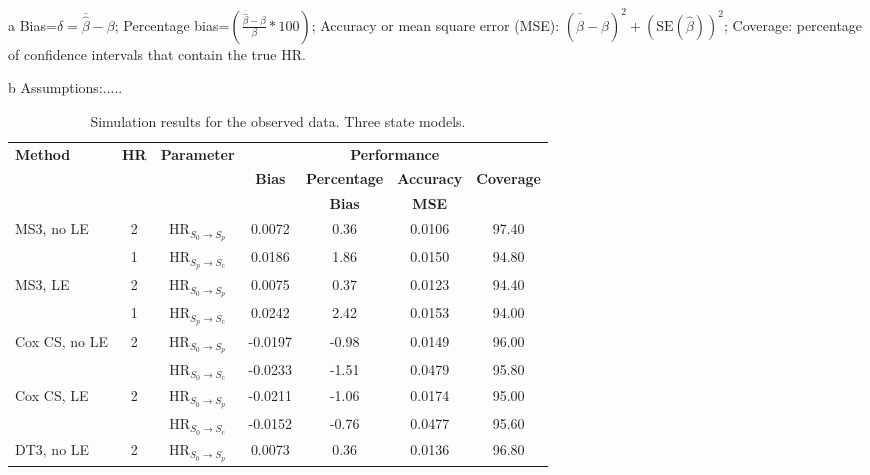 \documentclass{bmcart}
\begin{document}
\begin{backmatter}
\begin{table}[!ht]
\begin{threeparttable}
\begin{tablenotes}
      \item[a] Bias=$\delta=\overline{\hat\beta}-\beta$; Percentage bias=$\left(\frac{\overline{\hat\beta}-\beta}{\beta}*100 \right)$; Accuracy or mean square error (MSE): $(\overline{\hat\beta}-\beta)^2+(\mbox{SE}(\hat \beta))^2$;  Coverage: percentage of confidence intervals that contain the true HR.
      \item[b] Assumptions:.....
    \end{tablenotes}
  \end{threeparttable}
  \label{tab:HRFP_complete}
\end{table}

\begin{table}[!ht]
  \caption{Simulation results for the observed data. Three state models.}
  \begin{threeparttable}
    \begin{tabular}{l|c|c|c|c|c|c}
      \toprule
      \textbf{Method} &   \textbf{HR} & \textbf{Parameter} &\multicolumn{4}{c}{\textbf{Performance}\tnote{a,b}} \\ \cline{4-7}
      & & & \textbf{Bias} & \textbf{Percentage} & \textbf{Accuracy}  &  \textbf{Coverage}  \\
      & & & & \textbf{Bias} &   \textbf{MSE}\\
      \midrule
      \multirow{2}{*}{\parbox{0.2\textwidth}{MS3, no LE}} & 2 & HR$_{S_0 \rightarrow S_p}$ &0.0072&0.36&0.0106&	97.40\\
      &1 & HR$_{S_p \rightarrow S_c}$& 0.0186	&1.86&0.0150&	94.80\\
      \cmidrule{1-7}
      \multirow{2}{*}{\parbox{0.2\textwidth}{MS3, LE}} & 2 & HR$_{S_0 \rightarrow S_p}$ &0.0075 &0.37&0.0123&	94.40\\
      & 1 & HR$_{S_p \rightarrow S_c}$ &0.0242&2.42	&0.0153	&94.00\\
      \midrule
      \multirow{2}{*}{\parbox{0.2\textwidth}{Cox CS, no LE}} & \multirow{2}{*}{2} & HR$_{S_0 \rightarrow S_p}$ &-0.0197 &	-0.98&0.0149& 96.00\\
      && HR$_{S_0 \rightarrow S_c}$ & -0.0233&	-1.51 &0.0479	& 95.80\\
      \cmidrule{1-7}
      \multirow{2}{*}{\parbox{0.2\textwidth}{Cox CS, LE}} & \multirow{2}{*}{2} & HR$_{S_0 \rightarrow S_p}$ &-0.0211 &-1.06 &	0.0174 &	95.00\\
      && HR$_{S_0 \rightarrow S_c}$ &-0.0152	&-0.76	&0.0477&95.60\\
      \midrule
      \multirow{2}{*}{\parbox{0.2\textwidth}{DT3, no LE}} & \multirow{2}{*}{2} & HR$_{S_0 \rightarrow S_p}$ & 0.0073	&0.36	&0.0136&	96.80\\

\end{tabular}
\end{threeparttable}
\end{table}
\end{backmatter}
\end{document}
